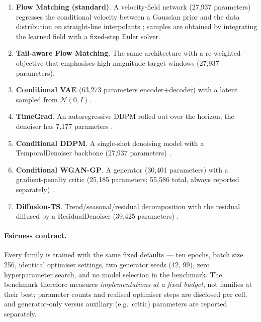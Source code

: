 \begin{enumerate}
    \item \textbf{Flow Matching (standard)}. A velocity-field network
    (27{,}937 parameters) regresses the conditional velocity between a
    Gaussian prior and the data distribution on straight-line interpolants
    \citep{lipman2023flow}; samples are obtained by integrating the learned
    field with a fixed-step Euler solver.
    \item \textbf{Tail-aware Flow Matching}. The same architecture with a
    re-weighted objective that emphasises high-magnitude target windows
    (27{,}937 parameters).
    \item \textbf{Conditional VAE} (63{,}273 parameters encoder+decoder)
    \citep{kingma2014autoencoding} with a latent sampled from $\mathcal{N}(0,I)$.
    \item \textbf{TimeGrad}. An autoregressive DDPM rolled out over the
    horizon; the denoiser has 7{,}177 parameters \citep{rasul2021timegrad}.
    \item \textbf{Conditional DDPM}. A single-shot denoising model with a
    TemporalDenoiser backbone (27{,}937 parameters) \citep{ho2020denoising}.
    \item \textbf{Conditional WGAN-GP}. A generator (30{,}401 parameters) with
    a gradient-penalty critic (25{,}185 parameters; 55{,}586 total, always
    reported separately) \citep{gulrajani2017wgangp}.
    \item \textbf{Diffusion-TS}. Trend/seasonal/residual decomposition with
    the residual diffused by a ResidualDenoiser (39{,}425 parameters)
    \citep{yuan2024diffusionts}.
\end{enumerate}

\paragraph{Fairness contract.} Every family is trained with the same fixed
defaults --- ten epochs, batch size 256, identical optimiser settings, two
generator seeds (42, 99), zero hyperparameter search, and no model selection
in the benchmark. The benchmark therefore measures \emph{implementations at a
fixed budget}, not families at their best; parameter counts and realised
optimiser steps are disclosed per cell, and generator-only versus auxiliary
(e.g.\ critic) parameters are reported separately.

